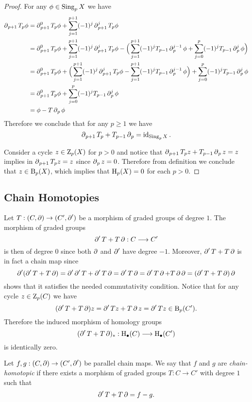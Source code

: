 \begin{proof}
For any \(\phi \in \operatorname{Sing}_p X\) we have
\begin{align*}
  \operatorname{\partial}_{p+1} T_p \phi
  &= \operatorname{\partial}_{p+1}^0 T_p \phi + \sum_{j=1}^{p+1} (-1)^j \operatorname{\partial}_{p+1}^j T_p \phi \\
  &= \operatorname{\partial}_{p+1}^0 T_p \phi + \sum_{j=1}^{p+1} (-1)^j \operatorname{\partial}_{p+1}^j T_p \phi
    - \Big(
      \sum_{j=1}^{p+1} (-1)^j T_{p-1} \operatorname{\partial}_p^{j-1} \phi
      + \sum_{j=0}^p (-1)^j T_{p-1} \operatorname{\partial}_p^j \phi
    \Big) \\
  &= \operatorname{\partial}_{p+1}^0 T_p \phi + \Big(
      \sum_{j=1}^{p+1} (-1)^j \operatorname{\partial}_{p+1}^j T_p \phi
      - \sum_{j=1}^{p+1} (-1)^j T_{p-1} \operatorname{\partial}_p^{j-1} \phi
    \Big) + \sum_{j=0}^p (-1)^j T_{p-1} \operatorname{\partial}_p^j \phi \\
  &= \operatorname{\partial}_{p+1}^0 T_p \phi + \sum_{j=0}^p (-1)^j T_{p-1} \operatorname{\partial}_p^j \phi \\
  &= \phi - T \operatorname{\partial}_p \phi
\end{align*}
Therefore we conclude that for any \(p \geq 1\) we have
\[
\operatorname{\partial}_{p+1} T_p + T_{p-1} \operatorname{\partial}_p = \operatorname{id}_{\operatorname{Sing}_p X}.
\]

Consider a cycle \(z \in \operatorname{Z}_p(X)\) for \(p > 0\) and notice that
\(\operatorname{\partial}_{p+1} T_p z + T_{p-1} \operatorname{\partial}_p z = z\) implies in
\(\operatorname{\partial}_{p+1} T_p z = z\) since \(\operatorname{\partial}_p z = 0\). Therefore from definition we
conclude that \(z \in \operatorname{B}_p(X)\), which implies that \(\operatorname{H}_p(X) = 0\) for each
\(p > 0\).
\end{proof}

\subsection{Chain Homotopies}

Let \(T: (C, \operatorname{\partial}) \to (C', \operatorname{\partial}')\) be a morphism of
graded groups of degree \(1\). The morphism of graded groups
\[
\operatorname{\partial}' T + T \operatorname{\partial}: C \longrightarrow C'
\]
is then of degree \(0\) since both \(\operatorname{\partial}\) and \(\operatorname{\partial}'\) have degree
\(-1\). Moreover, \(\operatorname{\partial}' T + T \operatorname{\partial}\) is in fact a chain map since
\[
\operatorname{\partial}'(\operatorname{\partial}' T + T \operatorname{\partial})
= \operatorname{\partial}' \operatorname{\partial}' T + \operatorname{\partial}' T \operatorname{\partial}
= \operatorname{\partial}' T \operatorname{\partial}
= \operatorname{\partial}' T \operatorname{\partial} + T \operatorname{\partial} \operatorname{\partial}
= (\operatorname{\partial}' T + T \operatorname{\partial}) \operatorname{\partial}
\]
shows that it satisfies the needed commutativity condition. Notice that for any
cycle \(z \in \operatorname{Z}_p(C)\) we have
\[
(\operatorname{\partial}' T + T \operatorname{\partial}) z = \operatorname{\partial}' T z + T \operatorname{\partial} z = \operatorname{\partial}' T z \in \operatorname{B}_p(C').
\]
Therefore the induced morphism of homology groups
\[
(\operatorname{\partial}' T + T \operatorname{\partial})_{*}: \operatorname{H}_{\bullet}(C) \longrightarrow \operatorname{H}_{\bullet}(C')
\]
is identically zero.

\begin{definition}
\label{def:chain-homotopic-maps}
Let \(f, g: (C, \operatorname{\partial}) \to (C', \operatorname{\partial}')\) be parallel chain
maps. We say that \(f\) and \(g\) are \emph{chain-homotopic} if there exists a
morphism of graded groups \(T: C \to C'\) with degree \(1\)
such that
\[
\operatorname{\partial}' T + T \operatorname{\partial} = f - g.
\]
\end{definition}

